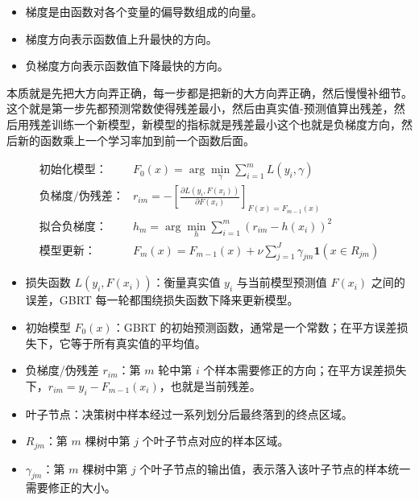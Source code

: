 \begin{dxtips}
  \begin{itemize}
    \item 梯度是由函数对各个变量的偏导数组成的向量。
    \item 梯度方向表示函数值上升最快的方向。
    \item 负梯度方向表示函数值下降最快的方向。
\end{itemize}
\end{dxtips}
\begin{dxtips}
    本质就是先把大方向弄正确，每一步都是把新的大方向弄正确，然后慢慢补细节。这个就是第一步先都预测常数使得残差最小，然后由真实值-预测值算出残差，然后用残差训练一个新模型，新模型的指标就是残差最小这个也就是负梯度方向，然后新的函数乘上一个学习率加到前一个函数后面。
\end{dxtips}
\[
\begin{array}{ll}
\text{初始化模型：}
&
F_0(x)=\arg\min_{\gamma}\sum_{i=1}^{m}L(y_i,\gamma)
\\[8pt]

\text{负梯度/伪残差：}
&
r_{im}
=
-\left[
\frac{\partial L(y_i,F(x_i))}
{\partial F(x_i)}
\right]_{F(x)=F_{m-1}(x)}
\\[8pt]

\text{拟合负梯度：}
&
h_m
=
\arg\min_{h}
\sum_{i=1}^{m}
\left(r_{im}-h(x_i)\right)^2
\\[8pt]



\text{模型更新：}
&
F_m(x)
=
F_{m-1}(x)
+
\nu
\sum_{j=1}^{J}
\gamma_{jm}\mathbf{1}(x\in R_{jm})
\end{array}
\]
\begin{dxtips}
  \begin{itemize}
    \item 损失函数 $L(y_i,F(x_i))$：衡量真实值 $y_i$ 与当前模型预测值 $F(x_i)$ 之间的误差，GBRT 每一轮都围绕损失函数下降来更新模型。
    \item 初始模型 $F_0(x)$：GBRT 的初始预测函数，通常是一个常数；在平方误差损失下，它等于所有真实值的平均值。
    \item 负梯度/伪残差 $r_{im}$：第 $m$ 轮中第 $i$ 个样本需要修正的方向；在平方误差损失下，$r_{im}=y_i-F_{m-1}(x_i)$，也就是当前残差。
   
   
    
\end{itemize}
\end{dxtips}
\begin{itemize}
    \item 叶子节点：决策树中样本经过一系列划分后最终落到的终点区域。
    \item $R_{jm}$：第 $m$ 棵树中第 $j$ 个叶子节点对应的样本区域。
    \item $\gamma_{jm}$：第 $m$ 棵树中第 $j$ 个叶子节点的输出值，表示落入该叶子节点的样本统一需要修正的大小。
\end{itemize}
